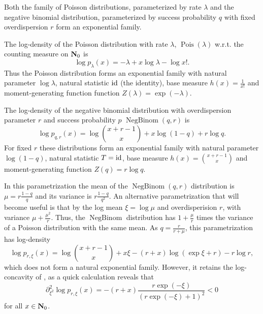 \begin{example}
    \label{ex:pois_negbinom}
    Both the family of Poisson distributions, parameterized by rate $\lambda$ and the negative binomial distribution, parameterized by success probability $q$ with fixed overdispersion $r$ form an exponential family.

    The log-density of the Poisson distribution with rate $\lambda$, $\operatorname{Pois} (\lambda)$ w.r.t. the counting measure on $\mathbf N_{0}$ is 
    $$
    \log p_{\lambda} (x) = -\lambda + x\log \lambda - \log x!.
    $$
    Thus the Poisson distribution forms an exponential family with natural parameter $\log \lambda$, natural statistic $\operatorname{id}$ (the identity), base measure $h(x) = \frac{1}{x!}$ and moment-generating function function $Z(\lambda) = \exp \left( -\lambda \right)$. 

    The log-density of the negative binomial distribution with overdispersion parameter $r$ and success probability $p$ $\operatorname{NegBinom} \left( q, r \right)$ is 
    $$
    \log p_{q,r}(x) = \log \binom{x + r - 1}{x} + x \log (1 - q) + r \log q.
    $$
    For fixed $r$ these distributions form an exponential family with natural parameter $\log (1 - q )$, natural statistic $T = \operatorname{id}$, base measure $h(x) = \binom{x + r - 1}{x}$ and moment-generating function $Z(q) = r \log q$. 

    In this parametrization the mean of the $\operatorname{NegBinom}(q,r)$ distribution is $\mu = r \frac{1 - q}{q}$ and its variance is $r \frac{1 - q}{q^{2}}$. An alternative parametrization that will become useful  is that by the log mean $\xi = \log \mu$ and overdisperision $r$, with variance $\mu + \frac{\mu^{2}}{r}$. Thus, the $ \operatorname{NegBinom}$ distribution has $1 + \frac{\mu}{r}$ times the variance of a Poisson distribution with the same mean. As $q = \frac{r}{r + \mu}$, this parametrization has log-density
    $$
    \log p_{r,\xi}(x) = \log \binom{x + r - 1}{x} + x \xi  - (r + x) \log (\exp \xi + r) - r \log r,
    $$
    which does not form a natural exponential family. However, it retains the log-concavity of , as a quick calculation reveals that 
    $$
    \partial_{\xi^{2}}^{2} \log p_{r,\xi} (x) = -(r + x) \frac{r \exp (-\xi)}{(r \exp (-\xi) + 1)^{2}} < 0
    $$
    for all $x \in \mathbf N_{0}$. 
\end{example}


